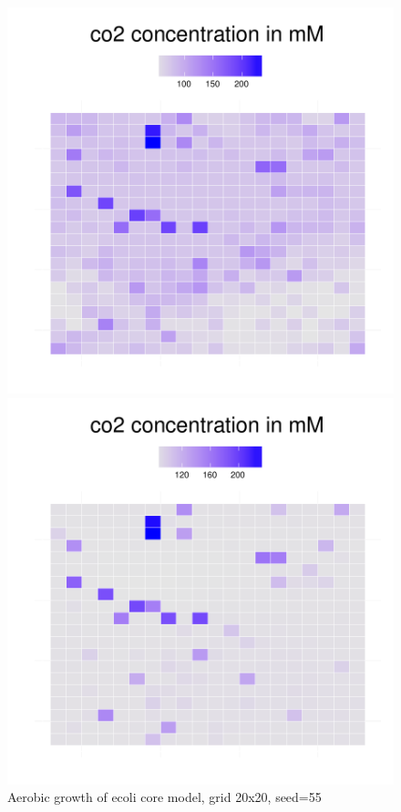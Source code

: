 \begin{figure}[h]
{\begin{minipage}[t]{0.3\textwidth}
  \end{minipage}
  \begin{minipage}[t]{0.3\textwidth}
    \includegraphics[width=\textwidth]{../results/beijerinckii_20x20_seed943_co250.pdf}
  \end{minipage}
  \begin{minipage}[t]{0.3\textwidth}
    \includegraphics[width=\textwidth]{../results/beijerinckii_20x20_seed943_co265.pdf}
  \end{minipage}
  }
  \caption{Aerobic growth of ecoli core model, grid 20x20, seed=55}
\end{figure}


